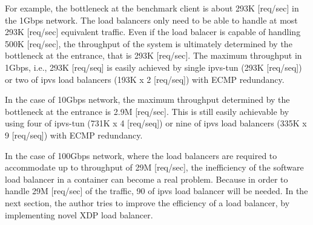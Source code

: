 For example, the bottleneck at the benchmark client is about 293K [req/sec] in the 1Gbps network. 
The load balancers only need to be able to handle at most 293K [req/sec] equivalent traffic.
Even if the load balacer is capable of handling 500K [req/sec], the throughput of the system is ultimately determined by the bottleneck at the entrance, that is 293K [req/sec].
The maximum throughput in 1Gbps, i.e., 293K [req/seq] is easily achieved by single ipvs-tun (293K [req/seq]) or two of ipvs load balancers (193K x 2 [req/seq]) with ECMP redundancy.

In the case of 10Gbps network, the maximum throughput determined by the bottleneck at the entrance is 2.9M [req/sec].
This is still easily achievable by using four of ipvs-tun (731K x 4 [req/seq]) or nine of ipvs load balancers (335K x 9 [req/seq]) with ECMP redundancy.

In the case of 100Gbps network, where the load balancers are required to accommodate up to throughput of 29M [req/sec], the inefficiency of the software load balancer in a container can become a real problem.
Because in order to handle 29M [req/sec] of the traffic, 90 of ipvs load balancer will be needed.
In the next section, the author tries to improve the efficiency of a load balancer, by implementing novel XDP load balancer.

